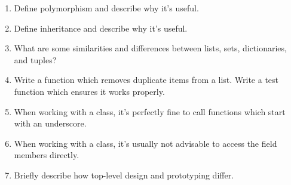 \documentclass[letter,10pt]{article}
\begin{document}
\begin{enumerate}
    \item Define polymorphism and describe why it's useful.
    
    \item Define inheritance and describe why it's useful.
    
    \item What are some similarities and differences between lists, sets, dictionaries, and tuples?
    
    \item Write a function which removes duplicate items from a list. Write a test function which ensures it works properly.
    
    \item When working with a class, it's perfectly fine to call functions which start with an underscore.
    
    \item When working with a class, it's usually not advisable to access the field members directly.
    
    \item Briefly describe how top-level design and prototyping differ.
    
\end{enumerate}
\end{document}
